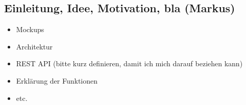 \subsection{Einleitung, Idee, Motivation, bla
(Markus)}\label{einleitung-idee-motivation-bla-markus}

\begin{itemize}
\item
  Mockups
\item
  Architektur
\item
  REST API (bitte kurz definieren, damit ich mich darauf beziehen kann)
\item
  Erklärung der Funktionen
\item
  etc.
\end{itemize}